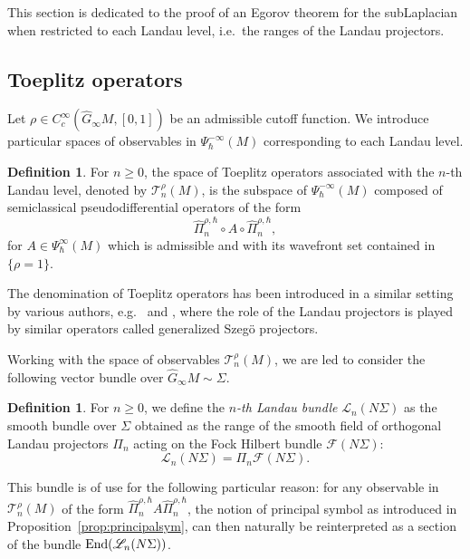 \documentclass[12pt,a4paper]{amsart}
\theoremstyle{plain}
\theoremstyle{definition}
\newtheorem{definition}[theorem]{Definition}
\theoremstyle{remark}
\numberwithin{equation}{section}
\theoremstyle{definition}
\def \Ghat{\widehat{G}}
\numberwithin{equation}{section}
\begin{document}
This section is dedicated to the proof of an Egorov theorem for the subLaplacian when restricted to each Landau level, i.e.~the ranges of the Landau projectors.

\subsection{Toeplitz operators}

Let $\rho\in C_c^\infty(\Ghat_\infty M,[0,1])$ be an admissible cutoff function. We introduce particular spaces of observables in $\Psi_\hbar^{-\infty}(M)$ corresponding to each Landau level.

\begin{definition}
    \label{def:gentoeplitz}
    For $n\geq 0$, the space of Toeplitz operators associated with the $n$-th Landau level, denoted by $\mathscr{T}_n^\rho(M)$, is the subspace of $\Psi_\hbar^{-\infty}(M)$ composed of semiclassical pseudodifferential operators of the form
    \begin{equation*}
        \hat{\Pi}_n^{\rho,\hbar}\circ A \circ\hat{\Pi}_n^{\rho,\hbar},
    \end{equation*}
    for $A\in\Psi_\hbar^{\infty}(M)$ which is admissible and with its wavefront set contained in $\{\rho = 1\}$.
\end{definition}

The denomination of Toeplitz operators has been introduced in a similar setting by various authors, e.g.\ \cite{Ep} and \cite{Tay}, where the role of the Landau projectors is played by similar operators called generalized Szegö projectors.

\vspace{0.25cm}

Working with the space of observables $\mathscr{T}_n^\rho(M)$, we are led to consider the following vector bundle over $\Ghat_\infty M\sim\Sigma$.

\begin{definition}
    \label{def:fibreLandau}
    For $n\geq 0$, we define the \emph{$n$-th Landau bundle} $\mathscr{L}_n(N\Sigma)$ as the smooth bundle over $\Sigma$ obtained as the range of the smooth field of orthogonal Landau projectors $\Pi_n$ acting on the Fock Hilbert bundle $\mathscr{F}(N\Sigma)$:
    \begin{equation*}
        \mathscr{L}_n(N\Sigma) = \Pi_n \mathscr{F}(N\Sigma).
    \end{equation*}
\end{definition}

This bundle is of use for the following particular reason: for any observable in $\mathscr{T}_n^\rho(M)$ of the form $\hat{\Pi}_n^{\rho,\hbar}A\hat{\Pi}_n^{\rho,\hbar}$, the notion of principal symbol as introduced in Proposition~\ref{prop:principalsym}, can then naturally be reinterpreted as a section of the bundle ${\rm End}(\mathscr{L}_n(N\Sigma))$.
\end{document}
